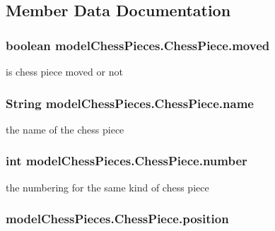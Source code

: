 \subsection{Member Data Documentation}
\hypertarget{classmodel_chess_pieces_1_1_chess_piece_a5bc0722badda5dc066b6a73476fc933c}{
\subsubsection[{moved}]{\setlength{\rightskip}{0pt plus 5cm}boolean model\+Chess\+Pieces.\+Chess\+Piece.\+moved\hspace{0.3cm}{\ttfamily [protected]}}}\label{classmodel_chess_pieces_1_1_chess_piece_a5bc0722badda5dc066b6a73476fc933c}
is chess piece moved or not \hypertarget{classmodel_chess_pieces_1_1_chess_piece_a03d2fb76fbbff0dab72d00f2173a69ff}{
\subsubsection[{name}]{\setlength{\rightskip}{0pt plus 5cm}String model\+Chess\+Pieces.\+Chess\+Piece.\+name\hspace{0.3cm}{\ttfamily [protected]}}}\label{classmodel_chess_pieces_1_1_chess_piece_a03d2fb76fbbff0dab72d00f2173a69ff}
the name of the chess piece \hypertarget{classmodel_chess_pieces_1_1_chess_piece_a979e63b99128333883acedc38d25dc87}{
\subsubsection[{number}]{\setlength{\rightskip}{0pt plus 5cm}int model\+Chess\+Pieces.\+Chess\+Piece.\+number\hspace{0.3cm}{\ttfamily [protected]}}}\label{classmodel_chess_pieces_1_1_chess_piece_a979e63b99128333883acedc38d25dc87}
the numbering for the same kind of chess piece \hypertarget{classmodel_chess_pieces_1_1_chess_piece_a3d4362d5b28f6edb14161196d9c6807d}{
\subsubsection[{position}]{ model\+Chess\+Pieces.\+Chess\+Piece.\+position\hspace{0.3cm}{\ttfamily [protected]}}}\label{classmodel_chess_pieces_1_1_chess_piece_a3d4362d5b28f6edb14161196d9c6807d}

